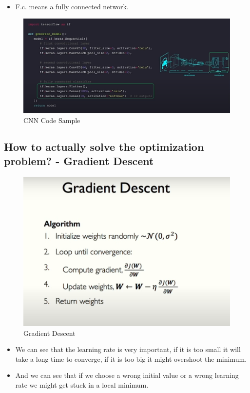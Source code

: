 \documentclass{article}
\begin{document}
\begin{itemize}
  \item F.c. means a fully connected network.
\end{itemize}
\begin{figure}[H]
  \centering
  \includegraphics[width = \textwidth]{Images/cnn2.png}
  \caption{CNN Code Sample}
\end{figure}
\subsection*{How to actually solve the optimization problem? - Gradient Descent}
\begin{figure}[H]
  \centering
  \includegraphics[width = \textwidth]{Images/gd.png}
  \caption{Gradient Descent}
\end{figure}
\begin{itemize}
  \item We can see that the learning rate is very important, if it is too small it will take a long time to converge, if it is too big it might overshoot the minimum.
  \item And we can see that if we choose a wrong initial value or a wrong learning rate we might get stuck in a local minimum.
\end{itemize}
\end{document}
